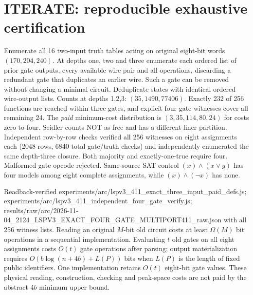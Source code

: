 \documentclass[11pt]{article}
\begin{document}
\section*{ITERATE: reproducible exhaustive certification}
\noindent Enumerate all 16 two-input truth tables acting on original eight-bit words $(170,204,240)$. At depths one, two and three enumerate each ordered list of prior gate outputs, every available wire pair and all operations, discarding a redundant gate that duplicates an earlier wire. Such a gate can be removed without changing a minimal circuit. Deduplicate states with identical ordered wire-output lists. Counts at depths 1,2,3: $(35,1490,77406)$. Exactly 232 of 256 functions are reached within three gates, and explicit four-gate witnesses cover all remaining 24. The \emph{paid} minimum-cost distribution is $(3,35,114,80,24)$ for costs zero to four. Seidler counts NOT as free and has a different finer partition. Independent row-by-row checks verified all 256 witnesses on eight assignments each (2048 rows, 6840 total gate/truth checks) and independently enumerated the same depth-three closure. Both majority and exactly-one-true require four. Malformed gate opcode rejected. Same-source SAT control $(x)\land(x\lor y)$ has four models among eight complete assignments, while $(x)\land(\neg x)$ has none.

\noindent Readback-verified experiments/arc/lspv3_411_exact_three_input_paid_defs.js; experiments/arc/lspv3_411_independent_four_gate_verify.js; results/raw/arc/2026-11-04_2124_LSPV3_EXACT_FOUR_GATE_MULTIPORT411_raw.json with all 256 witness lists. Reading an original $M$-bit old circuit costs at least $\Omega(M)$ bit operations in a sequential implementation. Evaluating $t$ old gates on all eight assignments costs $O(t)$ gate operations after parsing; output materialization requires $O(b\log(n+4b)+L(P))$ bits when $L(P)$ is the length of fixed public identifiers. One implementation retains $O(t)$ eight-bit gate values. These physical reading, construction, checking and peak-space costs are not paid by the abstract $4b$ minimum upper bound.
\end{document}
